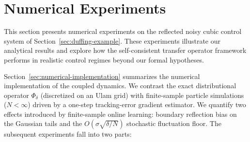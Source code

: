 \section{Numerical Experiments}
\label{sec:empirical-validation}

This section presents numerical experiments on the reflected noisy cubic control system of Section~\ref{sec:duffing-example}. These experiments illustrate our analytical results and explore how the self-consistent transfer operator framework performs in realistic control regimes beyond our formal hypotheses.

Section~\ref{sec:numerical-implementation} summarizes the numerical implementation of the coupled dynamics. We contrast the exact distributional operator $\Phi_\delta$ (discretized on an Ulam grid) with finite-sample particle simulations ($N<\infty$) driven by a one-step tracking-error gradient estimator. We quantify two effects introduced by finite-sample online learning: boundary reflection bias on the Gaussian tails and the $O(\sigma\sqrt{\delta/N})$ stochastic fluctuation floor. The subsequent experiments fall into two parts:

